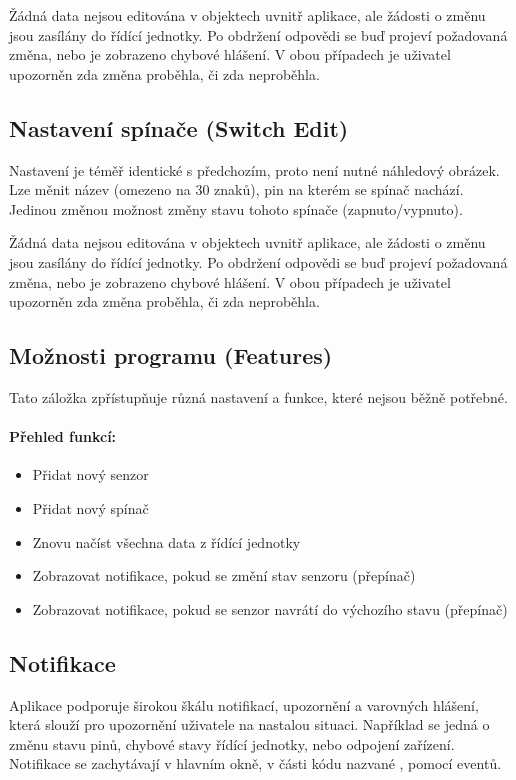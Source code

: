 \documentclass[FM,DP]{tulthesis}  %
\begin{document}
Žádná data nejsou editována v objektech uvnitř aplikace, ale žádosti o změnu jsou zasílány do řídící jednotky. Po obdržení odpovědi se buď projeví požadovaná změna, nebo je zobrazeno chybové hlášení. V obou případech je uživatel upozorněn zda změna proběhla, či zda neproběhla.

\subsection{Nastavení spínače (Switch Edit)}
Nastavení je téměř identické s předchozím, proto není nutné náhledový obrázek. Lze měnit název (omezeno na 30 znaků), pin na kterém se spínač nachází. Jedinou změnou možnost změny stavu tohoto spínače (zapnuto/vypnuto).

Žádná data nejsou editována v objektech uvnitř aplikace, ale žádosti o změnu jsou zasílány do řídící jednotky. Po obdržení odpovědi se buď projeví požadovaná změna, nebo je zobrazeno chybové hlášení. V obou případech je uživatel upozorněn zda změna proběhla, či zda neproběhla.

\subsection{Možnosti programu (Features)}
Tato záložka zpřístupňuje různá nastavení a funkce, které nejsou běžně potřebné.

\paragraph{Přehled funkcí:}
\begin{itemize}
\item Přidat nový senzor
\item Přidat nový spínač
\item Znovu načíst všechna data z řídící jednotky
\item Zobrazovat notifikace, pokud se změní stav senzoru (přepínač)
\item Zobrazovat notifikace, pokud se senzor navrátí do výchozího stavu (přepínač)
\end{itemize} 

\subsection{Notifikace}
Aplikace podporuje širokou škálu notifikací, upozornění a varovných hlášení, která slouží pro upozornění uživatele na nastalou situaci. Například se jedná o změnu stavu pinů, chybové stavy řídící jednotky, nebo odpojení zařízení. Notifikace se zachytávají v hlavním okně, v části kódu nazvané , pomocí eventů.
\end{document}
